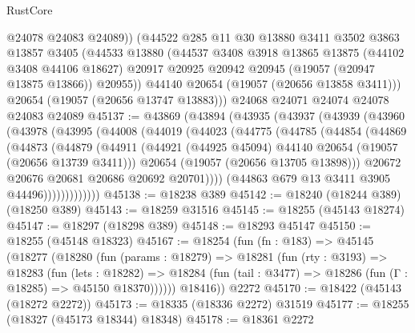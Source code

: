 \begin{lexlean}{RustCore}
\begin{coremodule}
          @24078
          @24083
          @24089))
      (@44522
        @285
        @11
        @30
        @13880
        @3411
        @3502
        @3863
        @13857
        @3405
        (@44533
          @13880
          (@44537
            @3408
            @3918
            @13865
            @13875
            (@44102 @3408 @44106 @18627)
            @20917
            @20925
            @20942
            @20945
            (@19057 (@20947 @13875 @13866))
            @20955))
        @44140
        @20654
        (@19057 (@20656 @13858 @3411)))
      @20654
      (@19057 (@20656 @13747 @13883)))
    @24068
    @24071
    @24074
    @24078
    @24083
    @24089
@45137 := @43869
    (@43894
      (@43935
        (@43937
          (@43939
            (@43960
              (@43978
                (@43995
                  (@44008
                    (@44019
                      (@44023
                        (@44775
                          (@44785
                            (@44854
                              (@44869
                                (@44873
                                  (@44879
                                    (@44911
                                      (@44921
                                        (@44925 @45094)
                                        @44140
                                        @20654
                                        (@19057 (@20656 @13739 @3411)))
                                      @20654
                                      (@19057 (@20656 @13705 @13898)))
                                    @20672
                                    @20676
                                    @20681
                                    @20686
                                    @20692
                                    @20701))))
                            (@44863 @679 @13 @3411 @3905 @44496)))))))))))))
@45138 := @18238 @389
@45142 := @18240 (@18244 @389) (@18250 @389)
@45143 := @18259 @31516
@45145 := @18255 (@45143 @18274)
@45147 := @18297 (@18298 @389)
@45148 := @18293 @45147
@45150 := @18255 (@45148 @18323)
@45167 := @18254
    (fun (fn : @183) =>
    @45145
      (@18277
        (@18280
          (fun (params : @18279) =>
          @18281
            (fun (rty : @3193) =>
            @18283
              (fun (lets : @18282) =>
              @18284 (fun (tail : @3477) => @18286 (fun (Γ : @18285) => @45150 @18370))))))
        @18416))
    @2272
@45170 := @18422 (@45143 (@18272 @2272))
@45173 := @18335 (@18336 @2272) @31519
@45177 := @18255 (@18327 (@45173 @18344) @18348)
@45178 := @18361 @2272

\end{coremodule}
\end{lexlean}
